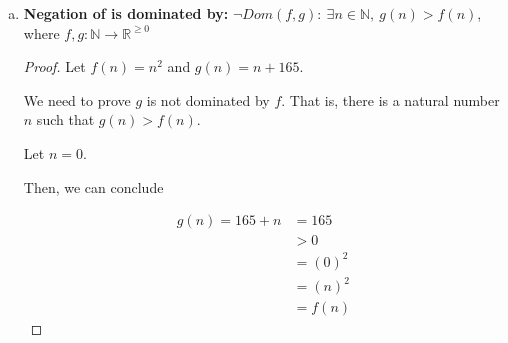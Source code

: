 \documentclass[12pt]{article}
\begin{document}
\begin{enumerate}[a.]
\begin{mdframed}
        \bigskip

        The header tells us $g(n) = n$ and $f(n) = 3n$.

        \bigskip

        \color{red}Since $n \geq 0$ from the fact $n \in \mathbb{N}$\color{black},
        starting from $g(n)$, we can conclude

        \setcounter{equation}{0}
        \begin{align}
            g(n) = n &\leq 3n\\
            &= f(n)
        \end{align}

    \end{mdframed}

    \bigskip

    \textbf{Notes:}

    \begin{itemize}
        \item Are there proof equivalent of program compliers or unit testing
        program? Is there a quick proof checklist one can go through to make sure
        the author avoids common mistakes?
    \end{itemize}

    \item

    \textbf{Negation of is dominated by:} $\neg Dom(f,g):\:\exists n \in \mathbb{N},
    \:g(n) > f(n)$, where $f,g:\mathbb{N} \to \mathbb{R}^{\geq 0}$

    \bigskip

    \begin{proof}

    Let $f(n) = n^2$ and $g(n) = n + 165$.

    \bigskip

    We need to prove $g$ is not dominated by $f$. That is, there is a natural
    number $n$ such that $g(n) > f(n)$.

    \bigskip

    Let $n = 0$.

    \bigskip

    Then, we can conclude

    \setcounter{equation}{0}
    \begin{align}
        g(n) = 165 + n &= 165\\
        &> 0\\
        &= (0)^2\\
        &= (n)^2\\
        &= f(n)
    \end{align}


\end{proof}
\end{enumerate}
\end{document}
